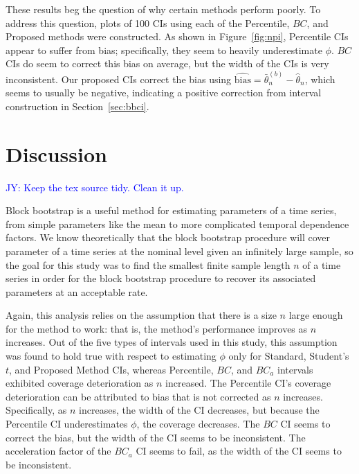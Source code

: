 \documentclass[12pt, letterpaper, titlepage]{article}
\newcommand{\jy}[1]{\textcolor{blue}{JY: #1}}
\begin{document}
These results beg the question of why certain methods perform poorly. To address 
this question, plots of 100 CIs using each of the Percentile, $BC$, and Proposed 
methods were constructed. As shown in Figure~\ref{fig:npi}, Percentile CIs
appear to suffer from bias; specifically, they seem to heavily underestimate
$\phi$. $BC$ CIs do seem to correct this bias on average, but the width of the
CIs is very inconsistent. Our proposed CIs correct the bias using 
$\widehat{\text{bias}} = \bar\theta_n^{(b)} -  \hat\theta_n$,
which seems to usually be negative, indicating a positive 
correction from interval construction in Section~\ref{sec:bbci}.


\section{Discussion}
\label{sec:disc}

\jy{Keep the tex source tidy. Clean it up.}


Block bootstrap is a useful method for estimating parameters of a time
series, from simple parameters like the mean to more complicated temporal
 dependence factors.
 We know theoretically that the block bootstrap procedure will cover
  parameter of a time series at the nominal level given an
 infinitely large
sample, so the goal for this study was to find the smallest finite
sample length $n$ of a time series in order for the block bootstrap procedure
to 
recover its associated parameters at an acceptable rate.

Again, this analysis relies on the assumption that
there is a size $n$ large enough for the method to work: that is, the method's
performance improves as $n$ increases. Out of the five types of intervals used
in this study, this assumption was found to hold true with respect to
estimating $\phi$ only for Standard, Student's $t$, and Proposed Method CIs, 
whereas Percentile, 
$BC$, and $BC_a$ intervals exhibited coverage deterioration as $n$
increased. The Percentile CI's coverage deterioration can be attributed to
bias that is not corrected as $n$ increases. Specifically, as $n$ increases, 
the width of the CI decreases, but because the Percentile CI
underestimates $\phi$, the coverage decreases. The $BC$ CI seems to correct the 
bias, but the width of the CI seems to be inconsistent. The acceleration 
factor of the $BC_a$ CI seems to fail, as the width of the CI
seems to be inconsistent. 
\end{document}
